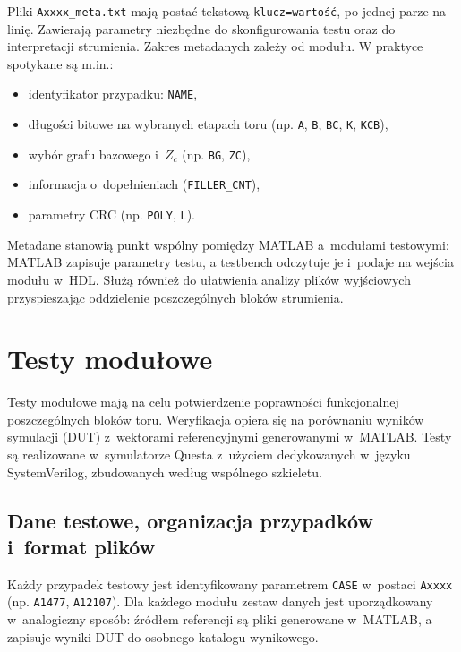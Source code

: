 Pliki \texttt{Axxxx\_meta.txt} mają postać tekstową \texttt{klucz=wartość}, po jednej parze na linię.
Zawierają parametry niezbędne do skonfigurowania testu oraz do interpretacji strumienia.
Zakres metadanych zależy od modułu. W praktyce spotykane są m.in.:
\begin{itemize}
    \item identyfikator przypadku: \texttt{NAME},
    \item długości bitowe na wybranych etapach toru (np. \texttt{A}, \texttt{B}, \texttt{BC}, \texttt{K}, \texttt{KCB}),
    \item wybór grafu bazowego i~$Z_c$ (np. \texttt{BG}, \texttt{ZC}),
    \item informacja o~dopełnieniach (\texttt{FILLER\_CNT}),
    \item parametry CRC (np. \texttt{POLY}, \texttt{L}).
\end{itemize}

Metadane stanowią punkt wspólny pomiędzy MATLAB a~modułami testowymi: MATLAB zapisuje parametry testu,
a testbench odczytuje je i~podaje na wejścia modułu w~HDL. Służą również do ułatwienia analizy plików wyjściowych przyspieszając oddzielenie poszczególnych bloków strumienia.

\section{Testy modułowe}
\label{sec:testy_modulowe}

Testy modułowe mają na celu potwierdzenie poprawności funkcjonalnej poszczególnych bloków toru.
Weryfikacja opiera się na porównaniu wyników symulacji (DUT) z~wektorami referencyjnymi generowanymi w~MATLAB.
Testy są realizowane w~symulatorze Questa z~użyciem dedykowanych  w~języku SystemVerilog,
zbudowanych według wspólnego szkieletu.

\subsection{Dane testowe, organizacja przypadków i~format plików}
\label{subsec:test_data_organization}

Każdy przypadek testowy jest identyfikowany parametrem \texttt{CASE} w~postaci \texttt{Axxxx}
(np. \texttt{A1477}, \texttt{A12107}).
Dla każdego modułu zestaw danych jest uporządkowany w~analogiczny sposób: źródłem referencji są pliki generowane w~MATLAB,
a  zapisuje wyniki DUT do osobnego katalogu wynikowego.


